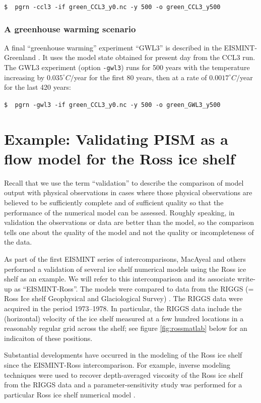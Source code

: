 \documentclass[11pt,final]{amsart}
\begin{document}
\verb|$  pgrn -ccl3 -if green_CCL3_y0.nc -y 500 -o green_CCL3_y500|

\subsubsection*{A greenhouse warming scenario}  A final ``greenhouse warming'' experiment ``GWL3'' is described in the EISMINT-Greenland \cite{RitzEISMINT}.  It uses the model state obtained for present day from the CCL3 run.  The GWL3 experiment (option \verb|-gwl3|) runs for 500 years with the temperature increasing by $0.035^\circ C/$year for the first 80 years, then at a rate of $0.0017^\circ C/$year for the last 420 years:

\verb|$  pgrn -gwl3 -if green_CCL3_y0.nc -y 500 -o green_GWL3_y500|



\clearpage\newpage
\section{Example: Validating PISM as a flow model for the Ross ice shelf}\label{sect:ross}  Recall that we use the term ``validation'' to describe the comparison of model output with physical observations in cases where those physical observations are believed to be sufficiently complete and of sufficient quality so that the performance of the numerical model can be assessed.  Roughly speaking, in validation the observations or data are better than the model, so the comparison tells one about the quality of the model and not the quality or incompleteness of the data.

As part of the first EISMINT series of intercomparisons, MacAyeal and others \cite{MacAyealetal} performed a validation of several ice shelf numerical models using the Ross ice shelf as an example.  We will refer to this intercomparison and its associate write-up \cite{MacAyealetal} as ``EISMINT-Ross''.  The models were compared to data from the RIGGS (= Ross Ice shelf Geophysical and Glaciological Survey) \cite{RIGGS1,RIGGS2}.  The RIGGS data were acquired in the period 1973--1978.   In particular, the RIGGS data include the (horizontal) velocity of the ice shelf measured at a few hundred locations in a reasonably regular grid across the shelf; see figure \ref{fig:rossmatlab} below for an indicaiton of these positions.

Substantial developments have occurred in the modeling of the Ross ice shelf since the EISMINT-Ross intercomparison.  For example, inverse modeling techniques were used to recover depth-averaged viscosity of the Ross ice shelf from the RIGGS data \cite{RommelaereMacAyeal} and a parameter-sensitivity study was performed for a particular Ross ice shelf numerical model \cite{HumbertGreveHutter}. 
\end{document}
